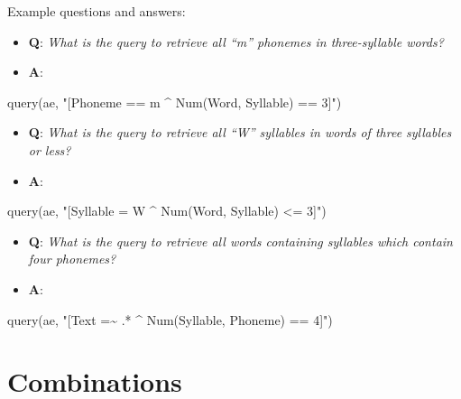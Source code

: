 \documentclass[
]{book}
\newenvironment{Shaded}{\begin{snugshade}}{\end{snugshade}}
\newcommand{\FunctionTok}[1]{\textcolor[rgb]{0.00,0.00,0.00}{#1}}
\newcommand{\NormalTok}[1]{#1}
\newcommand{\StringTok}[1]{\textcolor[rgb]{0.31,0.60,0.02}{#1}}
\providecommand{\tightlist}{%
  \setlength{\itemsep}{0pt}\setlength{\parskip}{0pt}}
\begin{document}
Example questions and answers:

\begin{itemize}
\tightlist
\item
  \textbf{Q}: \emph{What is the query to retrieve all ``m'' phonemes in three-syllable words?}
\item
  \textbf{A}:
\end{itemize}

\begin{Shaded}
\begin{Highlighting}[]
\FunctionTok{query}\NormalTok{(ae, }\StringTok{"[Phoneme == m \^{} Num(Word, Syllable) == 3]"}\NormalTok{)}
\end{Highlighting}
\end{Shaded}

\begin{itemize}
\tightlist
\item
  \textbf{Q}: \emph{What is the query to retrieve all ``W'' syllables in words of three syllables or less?}
\item
  \textbf{A}:
\end{itemize}

\begin{Shaded}
\begin{Highlighting}[]
\FunctionTok{query}\NormalTok{(ae, }\StringTok{"[Syllable = W \^{} Num(Word, Syllable) \textless{}= 3]"}\NormalTok{)}
\end{Highlighting}
\end{Shaded}

\begin{itemize}
\tightlist
\item
  \textbf{Q}: \emph{What is the query to retrieve all words containing syllables which contain four phonemes?}
\item
  \textbf{A}:
\end{itemize}

\begin{Shaded}
\begin{Highlighting}[]
\FunctionTok{query}\NormalTok{(ae, }\StringTok{"[Text =\textasciitilde{} .* \^{} Num(Syllable, Phoneme) == 4]"}\NormalTok{)}
\end{Highlighting}
\end{Shaded}

\hypertarget{combinations}{%
\section{Combinations}\label{combinations}}
\end{document}
